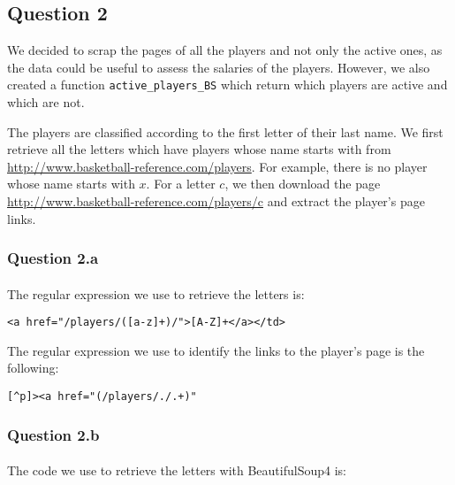 
\subsection{Question 2}
\label{subsec:312}
We decided to scrap the pages of all the players and not only the active ones, as the data could be useful to assess the salaries of the players. However, we also created a function \verb|active_players_BS| which return which players are active and which are not.

The players are classified according to the first letter of their last name. We first retrieve all the letters which have players whose name starts with from \url{http://www.basketball-reference.com/players}. For example, there is no player whose name starts with $x$. For a letter $c$, we then download the page \url{http://www.basketball-reference.com/players/c} and extract the player's page links.

\subsubsection{Question 2.a}
\label{subsubsec:312a}
\paragraph{} The regular expression we use to retrieve the letters is:

\begin{verbatim}
<a href="/players/([a-z]+)/">[A-Z]+</a></td>
\end{verbatim}


The regular expression we use to identify the links to the player's page is the following:

\begin{verbatim}
[^p]><a href="(/players/./.+)"
\end{verbatim}

\subsubsection{Question 2.b}
\label{subsubsec:312b}

\paragraph{}The code we use to retrieve the letters with BeautifulSoup4 is:

